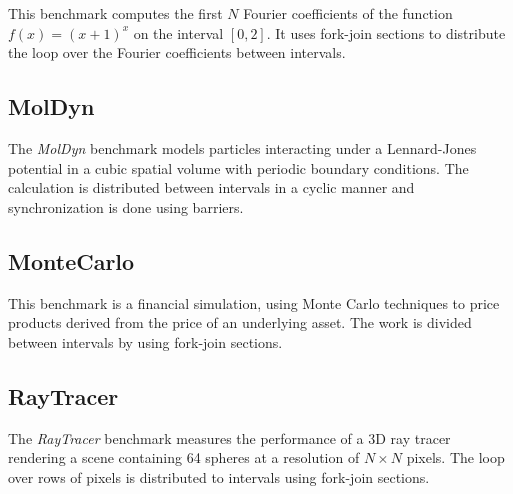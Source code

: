 This benchmark computes the first $N$ Fourier coefficients of the
function $f(x) = (x+1)^x$ on the interval $[0,2]$. It uses fork-join
sections to distribute the loop over the Fourier coefficients between
intervals.

\subsection*{MolDyn}

The \emph{MolDyn} benchmark models particles interacting under a
Lennard-Jones potential in a cubic spatial volume with periodic
boundary conditions. The calculation is distributed between intervals
in a cyclic manner and synchronization is done using barriers.

\subsection*{MonteCarlo}

This benchmark is a financial simulation, using Monte Carlo techniques
to price products derived from the price of an underlying asset. The
work is divided between intervals by using fork-join sections.

\subsection*{RayTracer}

The \emph{RayTracer} benchmark measures the performance of a 3D ray
tracer rendering a scene containing 64 spheres at a resolution of $N
\times N$ pixels. The loop over rows of pixels is distributed to
intervals using fork-join sections.


